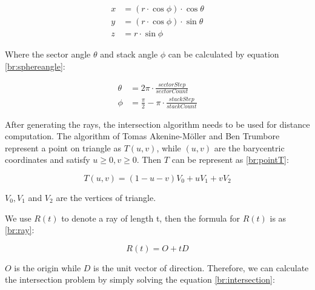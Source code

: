\begin{equation}
\label{br:spherecoord}
    \begin{aligned}
    x & = \left ( r\cdot \cos \phi  \right ) \cdot \cos \theta \\
    y & = \left ( r\cdot \cos \phi  \right ) \cdot \sin \theta \\
    z & = r\cdot \sin \phi 
    \end{aligned}
\end{equation}

Where the sector angle $ \theta $ and stack angle $ \phi $ can be calculated by equation \ref{br:sphereangle}:

\begin{equation}
\label{br:sphereangle}
   \begin{aligned}
    \theta & = 2\pi \cdot \frac{sectorStep}{sectorCount}  \\
    \phi & = \frac{\pi }{2} - \pi \cdot \frac{stackStep}{stackCount} 
    \end{aligned}
\end{equation}

\hspace*{\fill}

After generating the rays, the intersection algorithm needs to be used for distance computation. The algorithm of Tomas Akenine-M{\"o}ller and Ben Trumbore \cite{AkenineMller2005FastMS} represent a point on triangle as $ T(u, v)$, while $ (u, v) $ are the barycentric coordinates and satisfy $ u \geq 0, v \geq 0 $. Then $ T $ can be represent as \ref{br:pointT}:

\begin{equation}
    T(u, v)=(1-u-v) V_{0}+u V_{1}+v V_{2}
    \label{br:pointT}
\end{equation}

$ V_{0}, V_{1}$ and $ V_{2} $ are the vertices of triangle.

\hspace*{\fill}

We use $ R(t) $ to denote a ray of length t, then the formula for $ R(t) $ is as \ref{br:ray}:

\begin{equation}
    R(t)= O + t D
    \label{br:ray}
\end{equation}

$ O $ is the origin while $ D $ is the unit vector of direction.
Therefore, we can calculate the intersection problem by simply solving the equation \ref{br:intersection}:

